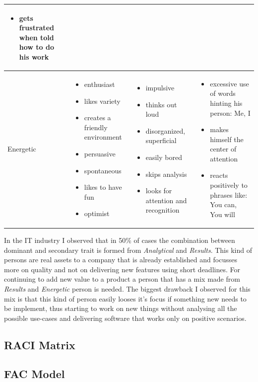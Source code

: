 \begin{table}[h]
\begin{tabular}{ | p{} | p{} | p{} | p{} |}
\begin{itemize}
       \item gets frustrated when told how to do his work
      \end{itemize}
     \\ \hline
    Energetic 
     &
      \begin{itemize}
       \item enthusiast
       \item likes variety
       \item creates a friendly environment
       \item persuasive 
       \item spontaneous
       \item likes to have fun
       \item optimist
      \end{itemize}
     &
     \begin{itemize}
      \item impulsive
      \item thinks out loud
      \item disorganized, superficial
      \item easily bored
      \item skips analysis
      \item looks for attention and recognition
     \end{itemize}
     & 
      \begin{itemize}
       \item excessive use of words hinting his person: Me, I 
       \item makes himself the center of attention
       \item reacts positively to phrases like: You can, You will
      \end{itemize}
     \\ \hline
    \end{tabular}
    \label{table:prae}
\end{table}
\FloatBarrier

In the IT industry I observed that in 50\% of cases the combination between dominant and secondary trait is formed from \textit{Analytical} and \textit{Results}. This kind of persons are real assets to a company that is already established and focusses more on quality and not on delivering new features using short deadlines. For continuing to add new value to a product a person that has a mix made from \textit{Results} and \textit{Energetic} person is needed. The biggest drawback I observed for this mix is that this kind of person easily looses it's focus if something new needs to be implement, thus starting to work on new things without analysing all the possible use-cases and delivering software that works only on positive scenarios.
\subsection{RACI Matrix}
\label{sub-sec:raci}
 \newline

\subsection{FAC Model}
\label{sub-sec:fac}
 \newline